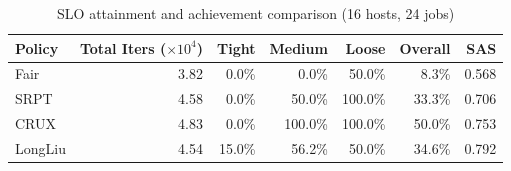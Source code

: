 \begin{table}[t]
\centering
\caption{SLO attainment and achievement comparison (16 hosts, 24 jobs)}
\label{tab:slo_16host}
\begin{tabular}{l|r|r|r|r|r|r}
\hline
Policy & Total Iters ($\times 10^4$) & Tight & Medium & Loose & Overall & SAS \\
\hline
Fair & 3.82 & 0.0\% & 0.0\% & 50.0\% & 8.3\% & 0.568 \\
SRPT & 4.58 & 0.0\% & 50.0\% & 100.0\% & 33.3\% & 0.706 \\
CRUX & 4.83 & 0.0\% & 100.0\% & 100.0\% & 50.0\% & 0.753 \\
LongLiu & 4.54 & 15.0\% & 56.2\% & 50.0\% & 34.6\% & 0.792 \\
\hline
\end{tabular}
\end{table}
